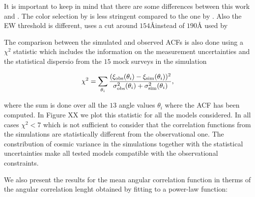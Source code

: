 \documentclass[usenatbib]{mn2e}
\begin{document}
It is important to keep in mind that there are some differences
between this work and \citep{Yamada2012}. The color selection by
\cite{Yamada2012} is less stringent compared to the one by
\cite{Hayashino2004}. Also the EW threshold is different,
\cite{Hayashino2004} uses a cut around $154$\AA instead of $190$\AA
used by \citep{Yamada2012}

The comparison between the simulated and observed ACFs is also done using a
$\chi^2$ statistic which includes the information on the measurement
uncertainties and the statistical dispersio from the $15$ mock surveys
in the simulation

\begin{equation}
\chi^{2} = \sum_{\theta_i} \frac{(\xi_{\rm obs}(\theta_i) - \xi_{\rm
    sim}(\theta_i))^2}{\sigma_{\rm obs}^2(\theta_i) + \sigma_{\rm
    sim}^2({\theta_i})}, 
\end{equation}

where the sum is done over all the $13$ angle values $\theta_i$ where the
ACF has been computed. In Figure XX we plot this statistic for all the
models considered. In all cases $\chi^{2}<7$ which is not sufficient
to consider that the correlation functions from the simulations are
statistically different from the observational one. The constribution
of cosmic variance in the simulations together with the statistical
uncertainties make all tested models compatible with the observational
constraints. 








We also present the results for the mean angular correlation function in
therms of the angular correlation lenght obtained  by fitting to a power-law
function:  
\end{document}
